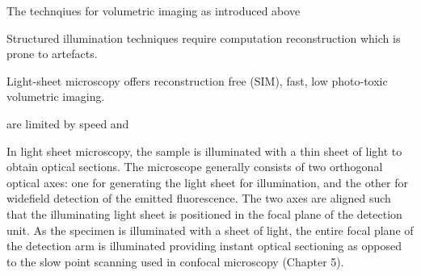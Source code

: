 The technqiues for volumetric imaging as introduced above

Structured illumination techniques require computation reconstruction which is prone to artefacts.

Light-sheet microscopy offers reconstruction free (SIM), fast, low photo-toxic volumetric imaging.


are limited by speed and

In light sheet microscopy, the sample is illuminated with a thin sheet of light to obtain optical sections.
The microscope generally consists of two orthogonal optical axes: one for generating the light sheet for illumination, and the other for widefield detection of the emitted fluorescence.
The two axes are aligned such that the illuminating light sheet is positioned in the focal plane of the detection unit.
As the specimen is illuminated with a sheet of light, the entire focal plane of the detection arm is illuminated providing instant optical sectioning as opposed to the slow point scanning used in confocal microscopy (Chapter 5).

